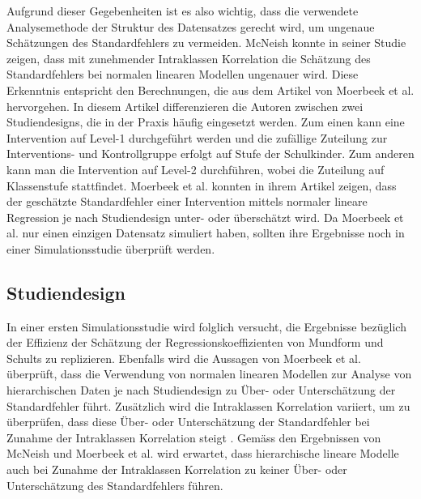 \documentclass[12pt]{article}\usepackage[]{graphicx}\usepackage[]{color}
\begin{document}
Aufgrund dieser Gegebenheiten ist es also wichtig, dass die verwendete Analysemethode der Struktur des Datensatzes gerecht wird, um ungenaue Schätzungen des Standardfehlers zu vermeiden. McNeish \citeyearpar{mcneish2014analyzing} konnte in seiner Studie zeigen, dass mit zunehmender Intraklassen Korrelation die Schätzung des Standardfehlers bei normalen linearen Modellen ungenauer wird. Diese Erkenntnis entspricht den Berechnungen, die aus dem Artikel von Moerbeek et al. \citeyearpar{MOERBEEK2003341} hervorgehen. In diesem Artikel differenzieren die Autoren zwischen zwei Studiendesigns, die in der Praxis häufig eingesetzt werden. Zum einen kann eine Intervention auf Level-1 durchgeführt werden und die zufällige Zuteilung zur Interventions- und Kontrollgruppe erfolgt auf Stufe der Schulkinder. Zum anderen kann man die Intervention auf Level-2 durchführen, wobei die Zuteilung auf Klassenstufe stattfindet. Moerbeek et al. \citeyearpar{MOERBEEK2003341} konnten in ihrem Artikel zeigen, dass der geschätzte Standardfehler einer Intervention mittels normaler lineare Regression je nach Studiendesign unter- oder überschätzt wird. Da Moerbeek et al. \citeyearpar{MOERBEEK2003341} nur einen einzigen Datensatz simuliert haben, sollten ihre Ergebnisse noch in einer Simulationsstudie überprüft werden. 

\subsection{Studiendesign}
In einer ersten Simulationsstudie wird folglich versucht, die Ergebnisse bezüglich der Effizienz der Schätzung der Regressionskoeffizienten von Mundform und Schults \citeyearpar{mundfrom2002monte} zu replizieren. Ebenfalls wird die Aussagen von Moerbeek et al. \citeyearpar{MOERBEEK2003341} überprüft, dass die Verwendung von normalen linearen Modellen zur Analyse von hierarchischen Daten je nach Studiendesign zu Über- oder Unterschätzung der Standardfehler führt. Zusätzlich wird die Intraklassen Korrelation variiert, um zu überprüfen, dass diese Über- oder Unterschätzung der Standardfehler bei Zunahme der Intraklassen Korrelation steigt \citep{mcneish2014analyzing}. Gemäss den Ergebnissen von McNeish \citeyearpar{mcneish2014analyzing} und Moerbeek et al. \citeyearpar{MOERBEEK2003341} wird erwartet, dass hierarchische lineare Modelle auch bei Zunahme der Intraklassen Korrelation zu keiner Über- oder Unterschätzung des Standardfehlers führen. 
\end{document}
